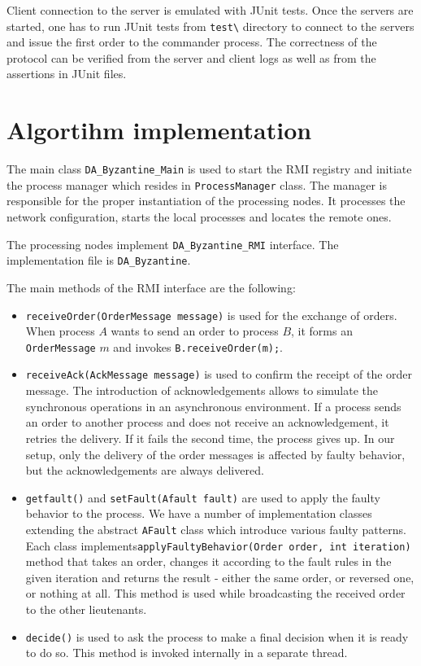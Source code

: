 \documentclass[a4paper, notitlepage]{article}
\begin{document}
Client connection to the server is emulated with JUnit tests. Once the servers are started, one has to run JUnit tests from \lstinline{test\} directory to connect to the servers and issue the first order to the commander process. The correctness of the protocol can be verified from the server and client logs as well as from the assertions in JUnit files.

\section{Algortihm implementation}

The main class \lstinline{DA_Byzantine_Main} is used to start the RMI registry and initiate the process manager which resides in \lstinline{ProcessManager} class. The manager is responsible for the proper instantiation of the processing nodes. It processes the network configuration, starts the local processes and locates the remote ones. 

The processing nodes implement \lstinline{DA_Byzantine_RMI} interface. The implementation file is \lstinline{DA_Byzantine}. 

The main methods of the RMI interface are the following:

\begin{itemize}
\item \lstinline{receiveOrder(OrderMessage message)} is used for the exchange of orders. When process $A$ wants to send an order to process $B$, it forms an \lstinline{OrderMessage} $m$ and invokes \lstinline{B.receiveOrder(m);}.
\item \lstinline{receiveAck(AckMessage message)} is used to confirm the receipt of the order message. The introduction of acknowledgements allows to simulate the synchronous operations in an asynchronous environment. If a process sends an order to another process and does not receive an acknowledgement, it retries the delivery. If it fails the second time, the process gives up. In our setup, only the delivery of the order messages is affected by faulty behavior, but the acknowledgements are always delivered. 
\item \lstinline{getfault()} and \lstinline{setFault(Afault fault)} are used to apply the faulty behavior to the process. We have a number of implementation classes extending the abstract \lstinline{AFault} class which introduce various faulty patterns. Each class implements\newline \lstinline{applyFaultyBehavior(Order order, int iteration)} method that takes an order, changes it according to the fault rules in the given iteration and returns the result - either the same order, or reversed one, or nothing at all. This method is used while broadcasting the received order to the other lieutenants.   
\item \lstinline{decide()} is used to ask the process to make a final decision when it is ready to do so. This method is invoked internally in a separate thread.
\end{itemize} 
\end{document}
